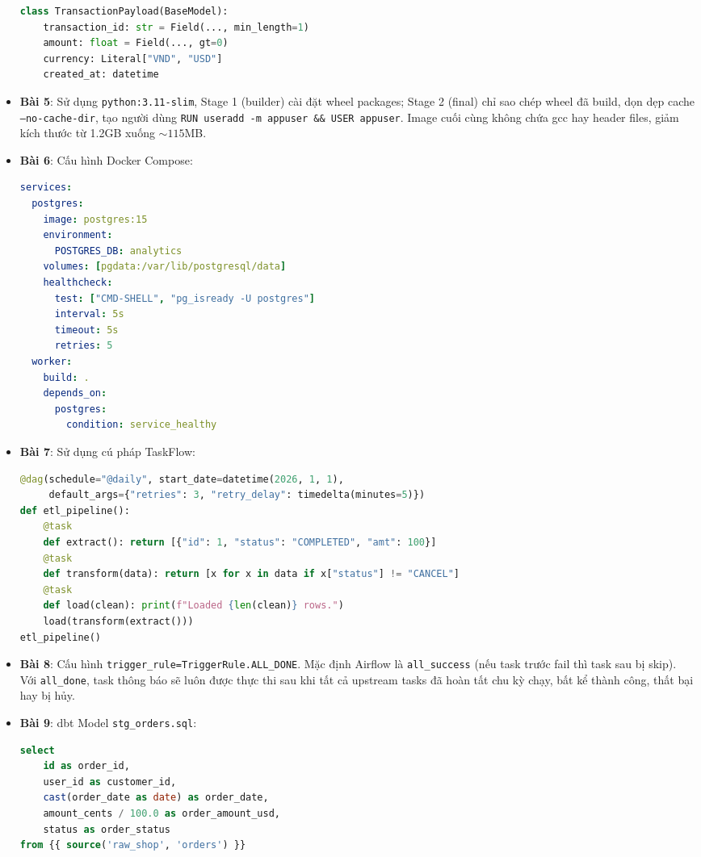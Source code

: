 \begin{dapanbox}
\begin{itemize}
\begin{lstlisting}[language=python]
class TransactionPayload(BaseModel):
    transaction_id: str = Field(..., min_length=1)
    amount: float = Field(..., gt=0)
    currency: Literal["VND", "USD"]
    created_at: datetime
    \end{lstlisting}
    \item \textbf{Bài 5}: Sử dụng \texttt{python:3.11-slim}, Stage 1 (builder) cài đặt wheel packages; Stage 2 (final) chỉ sao chép wheel đã build, dọn dẹp cache \texttt{--no-cache-dir}, tạo người dùng \texttt{RUN useradd -m appuser \&\& USER appuser}. Image cuối cùng không chứa gcc hay header files, giảm kích thước từ 1.2GB xuống $\sim 115$MB.
    \item \textbf{Bài 6}: Cấu hình Docker Compose:
    \begin{lstlisting}[language=yaml]
services:
  postgres:
    image: postgres:15
    environment:
      POSTGRES_DB: analytics
    volumes: [pgdata:/var/lib/postgresql/data]
    healthcheck:
      test: ["CMD-SHELL", "pg_isready -U postgres"]
      interval: 5s
      timeout: 5s
      retries: 5
  worker:
    build: .
    depends_on:
      postgres:
        condition: service_healthy
    \end{lstlisting}
    \item \textbf{Bài 7}: Sử dụng cú pháp TaskFlow:
    \begin{lstlisting}[language=python]
@dag(schedule="@daily", start_date=datetime(2026, 1, 1), 
     default_args={"retries": 3, "retry_delay": timedelta(minutes=5)})
def etl_pipeline():
    @task
    def extract(): return [{"id": 1, "status": "COMPLETED", "amt": 100}]
    @task
    def transform(data): return [x for x in data if x["status"] != "CANCEL"]
    @task
    def load(clean): print(f"Loaded {len(clean)} rows.")
    load(transform(extract()))
etl_pipeline()
    \end{lstlisting}
    \item \textbf{Bài 8}: Cấu hình \texttt{trigger\_rule=TriggerRule.ALL\_DONE}. Mặc định Airflow là \texttt{all\_success} (nếu task trước fail thì task sau bị skip). Với \texttt{all\_done}, task thông báo sẽ luôn được thực thi sau khi tất cả upstream tasks đã hoàn tất chu kỳ chạy, bất kể thành công, thất bại hay bị hủy.
    \item \textbf{Bài 9}: dbt Model \texttt{stg\_orders.sql}:
    \begin{lstlisting}[language=sql]
select
    id as order_id,
    user_id as customer_id,
    cast(order_date as date) as order_date,
    amount_cents / 100.0 as order_amount_usd,
    status as order_status
from {{ source('raw_shop', 'orders') }}

\end{lstlisting}
\end{itemize}
\end{dapanbox}
